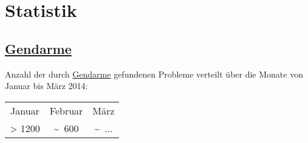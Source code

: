 %



\newpage



\section{Statistik}
\label{Abschnitt:Programmfehler:Statistik}





\subsection*{\hyperref[Abschnitt:Programmfehler:Werkzeuge:Automatisiert]{Gendarme}}

Anzahl der durch \hyperref[Abschnitt:Programmfehler:Werkzeuge:Automatisiert]{Gendarme} gefundenen Probleme verteilt über die Monate von Januar bis März 2014:\\

\begin{longtable}{ccc}

	  Januar
	& Februar
	& März
	
	\\
	
      > 1200
	& \textasciitilde~600
	& \textasciitilde~...

\end{longtable}




